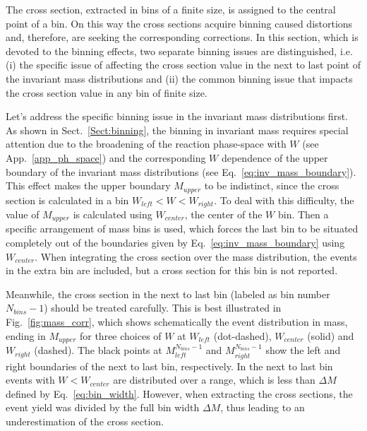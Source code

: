 The cross section, extracted in bins of a finite size, is assigned to the central point of a bin. On this way the cross sections acquire binning caused distortions and, therefore, are seeking the corresponding corrections. In this section, which is devoted to the binning effects, two separate binning issues are distinguished, i.e. (i) the specific issue of affecting the cross section value in the next to last point of the invariant mass distributions and (ii) the common binning issue that impacts the cross section value in any bin of finite size. 

Let's address the specific binning issue in the invariant mass distributions first. As shown in Sect.~\ref{Sect:binning}, the binning in invariant mass requires special attention due to the broadening of the reaction phase-space with $W$ (see App.~\ref{app_ph_space}) and the corresponding $W$ dependence of the upper boundary of the invariant mass distributions (see Eq.~\eqref{eq:inv_mass_boundary}). This effect makes the upper boundary $M_{upper}$ to be indistinct, since the cross section is calculated in a bin $W_{left} < W < W_{right}$. To deal with this difficulty, the value of $M_{upper}$ is calculated using $W_{center}$, the center of the $W$ bin. Then a specific arrangement of mass bins is used, which forces the last bin to be situated completely out of the boundaries given by Eq.~\eqref{eq:inv_mass_boundary} using $W_{center}$. When integrating the cross section over the mass distribution, the events in the extra bin are included, but a cross section for this bin is not reported.


Meanwhile, the cross section in the next to last bin (labeled as bin number $N_{bins}-1$) should be treated carefully. This is best illustrated in Fig.~\ref{fig:mass_corr}, which shows schematically the event distribution in mass, ending in $M_{upper}$ for three choices of $W$ at $W_{left}$ (dot-dashed), $W_{center}$ (solid) and $W_{right}$ (dashed). The black points at $M^{N_{bins}-1}_{left}$ and $M^{N_{bins}-1}_{right}$ show the left and right boundaries of the next to last bin, respectively. In the next to last bin events with $W < W_{center}$ are distributed over a range, which is less than $\Delta M$ defined by Eq.~\eqref{eq:bin_width}. However, when extracting the cross sections, the event yield was divided by the full bin width $\Delta M$, thus leading to an underestimation of the cross section.



